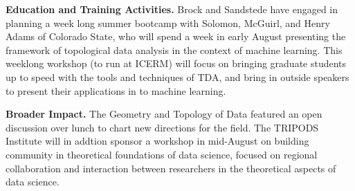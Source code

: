 {\bf Education and Training Activities.}
Brock and Sandstede have engaged in planning a week long summer bootcamp with Solomon, McGuirl, and Henry Adams of Colorado State, who will spend a week in early August presenting the framework of topological data analysis in the context of machine learning. This weeklong workshop (to run at ICERM) will focus on bringing graduate students up to speed with the tools and techniques of TDA, and bring in outside speakers to present their applications in to machine learning.

{\bf Broader Impact.} The Geometry and Topology of Data featured an open discussion over lunch to chart new directions for the field. The TRIPODS Institute will in addtion sponsor a workshop in mid-August on building community in theoretical foundations of data science, focused on regional collaboration and interaction between researchers in the theoretical aspects of data science.
